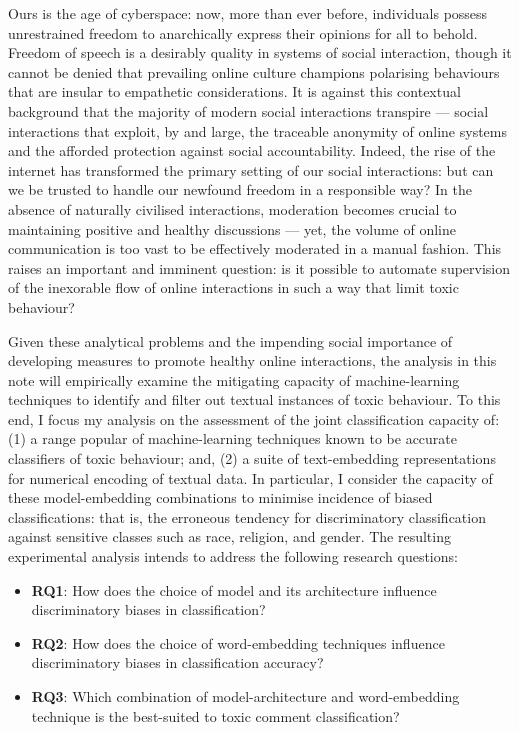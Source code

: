 
Ours is the age of cyberspace: now, more than ever before, individuals possess unrestrained freedom to anarchically express their opinions for all to behold. 
Freedom of speech is a desirably quality in systems of social interaction, though it cannot be denied that prevailing online culture champions polarising behaviours that are insular to empathetic considerations.
It is against this contextual background that the majority of modern social interactions transpire --- social interactions that exploit, by and large, the traceable anonymity of online systems and the afforded protection against social accountability. 
Indeed, the rise of the internet has transformed the primary setting of our social interactions: but can we be trusted to handle our newfound freedom in a responsible way?
In the absence of naturally civilised interactions, moderation becomes crucial to maintaining positive and healthy discussions --- yet, the volume of online communication is too vast to be effectively moderated in a manual fashion. This raises an important and imminent question: is it possible to automate supervision of the inexorable flow of online interactions in such a way that limit toxic behaviour?

Given these analytical problems and the impending social importance of developing measures to promote healthy online interactions, the analysis in this note will empirically examine the mitigating capacity of machine-learning techniques to identify and filter out textual instances of toxic behaviour.
To this end, I focus my analysis on the assessment of the joint classification capacity of: (1) a range popular of machine-learning techniques known to be accurate classifiers of toxic behaviour; and, (2) a suite of text-embedding representations for numerical encoding of textual data. 
In particular, I consider the capacity of these model-embedding combinations to minimise incidence of biased classifications: that is, the erroneous tendency for discriminatory classification against sensitive classes such as race, religion, and gender. The resulting experimental analysis intends to address the following research questions:

\begin{itemize}
	\item[] \textbf{RQ1}: How does the choice of model and its architecture influence discriminatory biases in classification?
	\item[] \textbf{RQ2}: How does the choice of word-embedding techniques influence discriminatory biases in classification accuracy?
	\item[] \textbf{RQ3}: Which combination of model-architecture and word-embedding technique is the best-suited to toxic comment classification?
\end{itemize}


